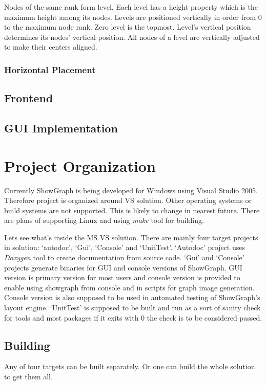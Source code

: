\documentclass[11pt,twoside,a4paper]{article}
\begin{document}
Nodes of the same rank form level. Each level has a height property which is the maximum height among its nodes. Levels are positioned vertically in order from 0 to the maximum node rank. Zero level is the topmost. Level's vertical position determines its nodes' vertical position. All nodes of a level are vertically adjusted to make their centers aligned.

\subsubsection{Horizontal Placement}


\subsection{Frontend}


\subsection{GUI Implementation}


\section{Project Organization}
Currently ShowGraph is being developed for Windows using Visual Studio 2005. Therefore project is organized around VS solution. Other operating systems or build systems are not supported. This is likely to change in nearest future. There are plans of supporting Linux and using \emph{make} tool for building.

Lets see what's inside the MS VS solution. There are mainly four target projects in solution: `autodoc', `Gui', `Console' and `UnitTest'. `Autodoc' project uses \emph{Doxygen} tool to create documentation from source code. `Gui' and `Console' projects generate binaries for GUI and console versions of ShowGraph. GUI version is primary version for most users and console version is provided to enable using showgraph from console and in scripts for graph image generation. Console version is also supposed to be used in automated testing of ShowGraph's layout engine. `UnitTest' is supposed to be built and run as a sort of sanity check for tools and most packages if it exits with 0 the check is to be considered passed.


\subsection{Building}
Any of four targets can be built separately. Or one can build the whole solution to get them all.
\end{document}
